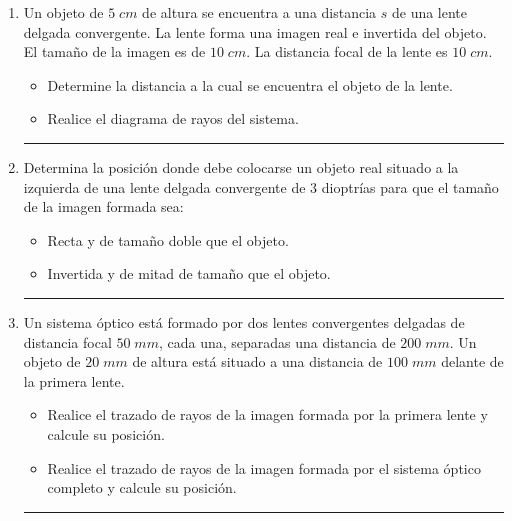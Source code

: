 \documentclass[a4paper,14pt]{exam}
\newcommand{\halmos}{\vspace*{-7mm}
	
					\begin{flushright}
						\rule{1mm}{2.5mm} 
					\end{flushright}\vspace*{-6mm}
						
					  }
\renewcommand{\qed}{\halmos}
\begin{document}
	
\vspace*{-2ex}

\vspace{3ex}

\begin{enumerate}
	
	
		\item   Un objeto de $5\;cm$ de altura se encuentra a una distancia $s$ de una lente delgada 
convergente. La lente forma una imagen real e invertida del objeto. El tamaño de la imagen es de
$10\;cm$. La distancia focal de la lente es $10\;cm$.
			\begin{itemize}
				\item[a)] Determine la distancia a la cual se encuentra el objeto de la lente.
				\item[b)] Realice el diagrama de rayos del sistema.				
			\end{itemize}
			\qed
			
			
	\item Determina la posición donde debe colocarse un objeto real situado a la izquierda de una lente delgada convergente de $3$ dioptrías para que el tamaño de la imagen formada  sea:
			\begin{itemize}
				\item[a)] Recta y de tamaño doble que el objeto.
				\item[b)] Invertida y de mitad de tamaño que el objeto.
			\end{itemize}
		\qed
	
	

	
	
	
	\item 	 Un sistema óptico está formado por dos lentes convergentes delgadas de
distancia focal $50\;mm$, cada una, separadas una distancia de $200\;mm$. Un objeto de $20\;mm$ de
altura está situado a una distancia de $100\;mm$ delante de la primera lente.
			\begin{itemize}
				\item[a)] Realice el trazado de rayos de la imagen formada por la primera lente y calcule su posición.
				\item[b)] Realice el trazado de rayos de la imagen formada por el sistema óptico completo y calcule su posición.
			\end{itemize}
	\qed
	

\end{enumerate}
\end{document}
